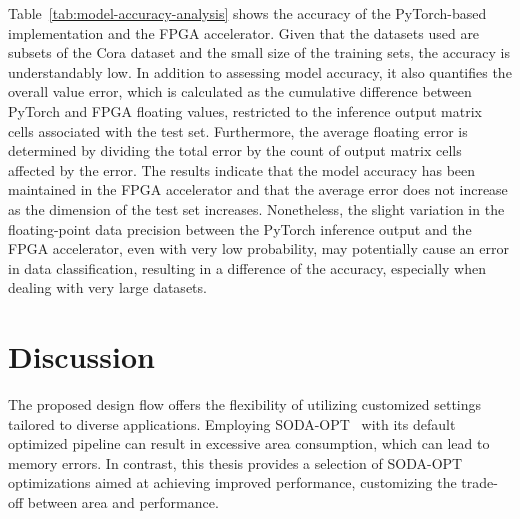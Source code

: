 Table~\ref{tab:model-accuracy-analysis} shows the accuracy of the PyTorch-based implementation and the FPGA accelerator.
Given that the datasets used are subsets of the Cora dataset and the small size of the training sets, the accuracy is understandably low.
In addition to assessing model accuracy, it also quantifies the overall value error, which is calculated as the cumulative difference between PyTorch and FPGA floating values, restricted to the inference output matrix cells associated with the test set.
Furthermore, the average floating error is determined by dividing the total error by the count of output matrix cells affected by the error.
The results indicate that the model accuracy has been maintained in the FPGA accelerator and that the average error does not increase as the dimension of the test set increases.
Nonetheless, the slight variation in the floating-point data precision between the PyTorch inference output and the FPGA accelerator, even with very low probability, may potentially cause an error in data classification, resulting in a difference of the accuracy, especially when dealing with very large datasets.

\section{Discussion}
\label{sec:sota-comparison}%


The proposed design flow offers the flexibility of utilizing customized settings tailored to diverse applications.
Employing SODA-OPT~\cite{9786533} with its default optimized pipeline can result in excessive area consumption, which can lead to memory errors.
In contrast, this thesis provides a selection of SODA-OPT optimizations aimed at achieving improved performance, customizing the trade-off between area and performance.

